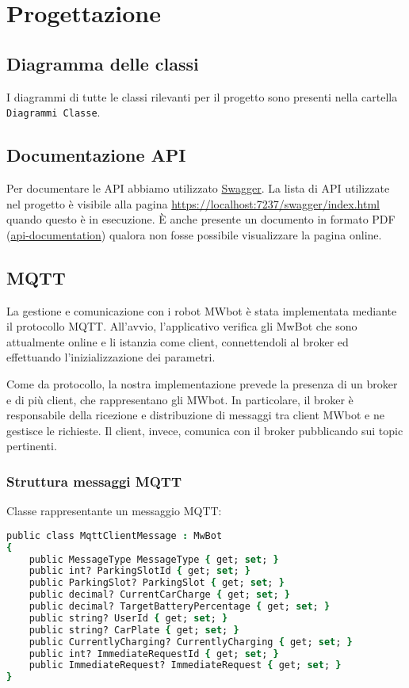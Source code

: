 \documentclass{article}
\begin{document}
\section{Progettazione}
\subsection{Diagramma delle classi}
I diagrammi di tutte le classi rilevanti per il progetto sono presenti nella cartella \texttt{Diagrammi Classe}. 
\subsection{Documentazione API}
Per documentare le API abbiamo utilizzato \href{https://swagger.io}{Swagger}. La lista di API utilizzate nel progetto è visibile alla pagina \url{https://localhost:7237/swagger/index.html} quando questo è in esecuzione. È anche presente un documento in formato PDF (\href{run:./api-documentation.pdf}{api-documentation}) qualora non fosse possibile visualizzare la pagina online.
\subsection{MQTT}
La gestione e comunicazione con i robot MWbot è stata implementata mediante il protocollo MQTT. All'avvio, l'applicativo verifica gli MwBot che sono attualmente online e li istanzia come client, connettendoli al broker ed effettuando l'inizializzazione dei parametri.

Come da protocollo, la nostra implementazione prevede la presenza di un broker e di più client, che rappresentano gli MWbot. In particolare, il broker è responsabile della ricezione e distribuzione di messaggi tra client MWbot e ne gestisce le richieste. Il client, invece, comunica con il broker pubblicando sui topic pertinenti.

\subsubsection{Struttura messaggi MQTT}
Classe rappresentante un messaggio MQTT:
\begin{lstlisting}[language=csh]
    public class MqttClientMessage : MwBot
{
    public MessageType MessageType { get; set; }
    public int? ParkingSlotId { get; set; }
    public ParkingSlot? ParkingSlot { get; set; }
    public decimal? CurrentCarCharge { get; set; }
    public decimal? TargetBatteryPercentage { get; set; }
    public string? UserId { get; set; }
    public string? CarPlate { get; set; }
    public CurrentlyCharging? CurrentlyCharging { get; set; }
    public int? ImmediateRequestId { get; set; }
    public ImmediateRequest? ImmediateRequest { get; set; }
}
\end{lstlisting}
\end{document}
